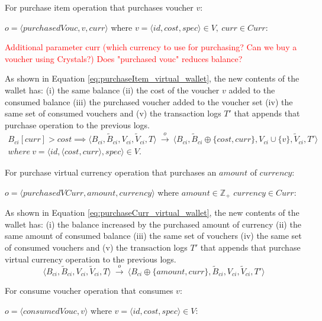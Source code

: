 \begin{enumerate}
	For purchase item operation that purchases voucher $v$:
	\begin{center}
		$o = \langle purchasedVouc, v, curr \rangle$ where $v=\langle id, cost, spec \rangle \in V, ~ curr \in Curr$:
	\end{center}
	
	\textcolor{red}{Additional parameter curr (which currency to use for purchasing? Can we buy a voucher using Crystals?) Does "purchased vouc" reduces balance? }
	
	As shown in Equation \ref{eq:purchaseItem_virtual_wallet}, the new contents of the wallet has: (i) the same balance (ii) the cost of the voucher $v$ added to the consumed balance (iii) the purchased voucher added to the voucher set (iv) the same set of consumed vouchers and (v) the transaction logs $T'$ that appends that purchase operation to the previous logs.	
	\begin{multline} \label{eq:purchaseItem_virtual_wallet}
		 B_{ci}[curr] > cost \implies \langle B_{ci}, \widetilde{B}_{ci}, V_{ci}, \widetilde{V}_{ci}, T \rangle ~ \overset{o}{\rightarrow} 
	    ~ \langle B_{ci}, \widetilde{B}_{ci} \oplus \{cost, curr\}, V_{ci} \cup \{v\}, \widetilde{V}_{ci}, T' \rangle \\
	    where ~ v = \langle id, \langle cost, curr \rangle, spec \rangle \in V.
	\end{multline}
	
	For purchase virtual currency operation that purchases an $amount$ of $currency$:
	\begin{center}
	$o = \langle purchasedVCurr, amount, currency \rangle$  where $amount \in \mathbb{Z}_{+}$  $currency \in Curr$:
	\end{center}
	
	As shown in Equation \ref{eq:purchaseCurr_virtual_wallet}, the new contents of the wallet has: (i) the balance increased by the purchased amount of currency (ii) the same amount of consumed balance (iii) the same set of vouchers (iv) the same set of consumed vouchers and (v) the transaction logs $T'$ that appends that purchase virtual currency operation to the previous logs.	
	\begin{equation} \label{eq:purchaseCurr_virtual_wallet}
	    \langle B_{ci}, \widetilde{B}_{ci}, V_{ci}, \widetilde{V}_{ci}, T \rangle ~ \overset{o}{\rightarrow}
	    ~ \langle B_{ci} \oplus \{amount, curr\}, \widetilde{B}_{ci}, V_{ci}, \widetilde{V}_{ci}, T' \rangle
	\end{equation}
	
	For consume voucher operation that consumes $v$:
	\begin{center}
		$o = \langle consumedVouc, v \rangle$ where $v=\langle id, cost, spec \rangle  \in V$:
	\end{center}
	

\end{enumerate}
